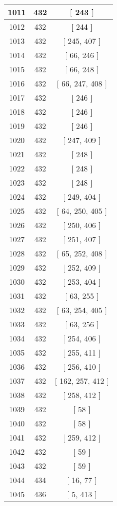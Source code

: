 \begin{center}
\begin{longtable}[H]{|| c c c ||}
\hline
1011 & 432 & [ 243 ] \\ 
\hline
1012 & 432 & [ 244 ] \\ 
\hline
1013 & 432 & [ 245, 407 ] \\ 
\hline
1014 & 432 & [ 66, 246 ] \\ 
\hline
1015 & 432 & [ 66, 248 ] \\ 
\hline
1016 & 432 & [ 66, 247, 408 ] \\ 
\hline
1017 & 432 & [ 246 ] \\ 
\hline
1018 & 432 & [ 246 ] \\ 
\hline
1019 & 432 & [ 246 ] \\ 
\hline
1020 & 432 & [ 247, 409 ] \\ 
\hline
1021 & 432 & [ 248 ] \\ 
\hline
1022 & 432 & [ 248 ] \\ 
\hline
1023 & 432 & [ 248 ] \\ 
\hline
1024 & 432 & [ 249, 404 ] \\ 
\hline
1025 & 432 & [ 64, 250, 405 ] \\ 
\hline
1026 & 432 & [ 250, 406 ] \\ 
\hline
1027 & 432 & [ 251, 407 ] \\ 
\hline
1028 & 432 & [ 65, 252, 408 ] \\ 
\hline
1029 & 432 & [ 252, 409 ] \\ 
\hline
1030 & 432 & [ 253, 404 ] \\ 
\hline
1031 & 432 & [ 63, 255 ] \\ 
\hline
1032 & 432 & [ 63, 254, 405 ] \\ 
\hline
1033 & 432 & [ 63, 256 ] \\ 
\hline
1034 & 432 & [ 254, 406 ] \\ 
\hline
1035 & 432 & [ 255, 411 ] \\ 
\hline
1036 & 432 & [ 256, 410 ] \\ 
\hline
1037 & 432 & [ 162, 257, 412 ] \\ 
\hline
1038 & 432 & [ 258, 412 ] \\ 
\hline
1039 & 432 & [ 58 ] \\ 
\hline
1040 & 432 & [ 58 ] \\ 
\hline
1041 & 432 & [ 259, 412 ] \\ 
\hline
1042 & 432 & [ 59 ] \\ 
\hline
1043 & 432 & [ 59 ] \\ 
\hline
1044 & 434 & [ 16, 77 ] \\ 
\hline
1045 & 436 & [ 5, 413 ] \\ 

\end{longtable}
\end{center}
